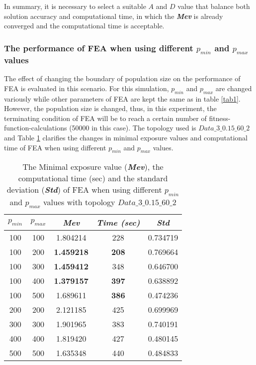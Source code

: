 \documentclass[final]{elsarticle}
\begin{document}
In summary, it is necessary to select a suitable $A$ and $D$ value that balance both solution accuracy and computational time, in which the \textbf{\textit{Mev}} is already converged and the computational time is acceptable.  

\subsubsection{The performance of FEA when using different $ p_{min} $ and $ p_{max} $ values}
The effect of changing the boundary of population size on the performance of FEA is evaluated in this scenario. For this simulation, $ p_{min} $ and $ p_{max} $ are changed variously while other parameters of FEA are kept the same as in table \ref{tab1}. However, the population size is changed, thus, in this experiment, the terminating condition of FEA will be to reach a certain number of fitness-function-calculations (50000 in this case). The topology used is $ Data\_3\_0.15\_60\_2 $ and Table \ref{tab2} clarifies the changes in minimal exposure values and computational time of FEA when using different $ p_{min} $ and $ p_{max} $ values.
\begin{table}
	\caption{The Minimal exposure value (\textbf{\textit{Mev}}), the computational time (sec) and the standard deviation (\textbf{\textit{Std}}) of FEA when using different $ p_{min} $ and $ p_{max} $ values with topology $ Data\_3\_0.15\_60\_2 $  }
	\label{tab2}       %
	\begin{center}
		\renewcommand{\arraystretch}{1.5}
		\begin{tabular}{|c|c|c|c|c|}
			\hline
			\textbf{$p_{min}$} & \textbf{$p_{max}$ } & \textit{\textbf{Mev}} &\textit{ \textbf{Time (sec)}} & \textit{\textbf{Std}} \\
			\hline
			100 & 100 &1.804214 &228 &0.734719\\
			\hline
			100 & 200 &\textbf{1.459218} &\textbf{208} &0.769664\\
			\hline
			100 & 300 &\textbf{1.459412} &348 &0.646700\\
			\hline
			100 & 400 &\textbf{1.379157} &\textbf{397} &0.638892\\
			\hline
			100 & 500 &1.689611 &\textbf{386} &0.474236\\
			\hline\hline
			200 & 200 &2.121185 &425 &0.699969\\\hline
			300 & 300 &1.901965 &383 &0.740191\\\hline
			400 & 400 &1.819420 &427 &0.480145\\\hline
			500 & 500 &1.635348 &440 &0.484833\\\hline
		\end{tabular}
	\end{center}
\end{table}
\end{document}
